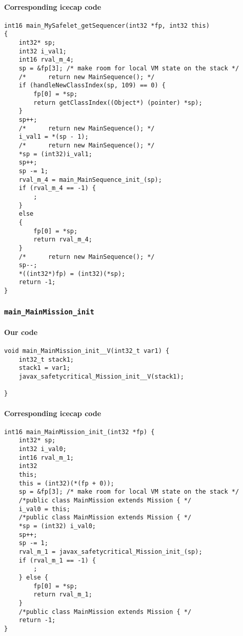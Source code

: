 \paragraph{Corresponding icecap code}\hfill
\begin{lstlisting}[firstnumber=56333]
int16 main_MySafelet_getSequencer(int32 *fp, int32 this)
{
	int32* sp;
	int32 i_val1;
	int16 rval_m_4;
	sp = &fp[3]; /* make room for local VM state on the stack */
	/*		return new MainSequence(); */
	if (handleNewClassIndex(sp, 109) == 0) {
		fp[0] = *sp;
		return getClassIndex((Object*) (pointer) *sp);
	}
	sp++;
	/*		return new MainSequence(); */
	i_val1 = *(sp - 1);
	/*		return new MainSequence(); */
	*sp = (int32)i_val1;
	sp++;
	sp -= 1;
	rval_m_4 = main_MainSequence_init_(sp);
	if (rval_m_4 == -1) {
		;
	}
	else
	{
		fp[0] = *sp;
		return rval_m_4;
	}
	/*		return new MainSequence(); */
	sp--;
	*((int32*)fp) = (int32)(*sp);
	return -1;
}
\end{lstlisting}


\subsubsection{\texttt{main\_MainMission\_init}}

\paragraph{Our code}\hfill
\begin{lstlisting}[firstnumber=1666]
void main_MainMission_init__V(int32_t var1) {
	int32_t stack1;
	stack1 = var1;
	javax_safetycritical_Mission_init__V(stack1);

}
\end{lstlisting}

\paragraph{Corresponding icecap code}\hfill
\begin{lstlisting}[firstnumber=55689]
int16 main_MainMission_init_(int32 *fp) {
	int32* sp;
	int32 i_val0;
	int16 rval_m_1;
	int32
	this;
	this = (int32)(*(fp + 0));
	sp = &fp[3]; /* make room for local VM state on the stack */
	/*public class MainMission extends Mission { */
	i_val0 = this;
	/*public class MainMission extends Mission { */
	*sp = (int32) i_val0;
	sp++;
	sp -= 1;
	rval_m_1 = javax_safetycritical_Mission_init_(sp);
	if (rval_m_1 == -1) {
		;
	} else {
		fp[0] = *sp;
		return rval_m_1;
	}
	/*public class MainMission extends Mission { */
	return -1;
}
\end{lstlisting}



